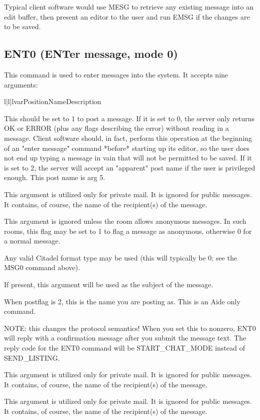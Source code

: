  Typical client software would use MESG to retrieve any existing message into
an edit buffer, then present an editor to the user and run EMSG if the changes
are to be saved.



\subsection{ENT0 (ENTer message, mode 0)}

 This command is used to enter messages into the system.  It accepts nine
arguments:


\begin{tableiii}{l|l|l}{var}{Position}{Name}{Description}

    {This should be set to 1 to post a message.  If it is set to 0, the server
    only returns OK or ERROR (plus any flags describing the error) without
    reading in a message.  Client software should, in fact, perform this
    operation at the beginning of an "enter message" command *before* starting
    up its editor, so the user does not end up typing a message in vain that
    will not be permitted to be saved.  If it is set to 2, the server will
    accept an "apparent" post name if the user is privileged enough. This post
    name is arg 5.}

    {This argument is utilized only for private mail.  It is ignored for public
    messages.  It contains, of course, the name of the recipient(s) of the
    message.}

    {This argument is ignored unless the room allows anonymous messages.  In
    such rooms, this flag may be set to 1 to flag a message as anonymous,
    otherwise 0 for a normal message.}

    {Any valid Citadel format type may be used (this will typically be 0; see
    the MSG0 command above).}

    {If present, this argument will be used as the subject of the message.}

    {When postflag is 2, this is the name you are posting as. This is an Aide
    only command.}

    {NOTE: this changes the protocol semantics!  When you set this to nonzero,
    ENT0 will reply with a confirmation message after you submit the message
    text.  The reply code for the ENT0 command will be START_CHAT_MODE instead
    of SEND_LISTING.}

    {This argument is utilized only for private mail.  It is ignored for public
    messages.  It contains, of course, the name of the recipient(s) of the
    message.}

    {This argument is utilized only for private mail.  It is ignored for public
    messages.  It contains, of course, the name of the recipient(s) of the
    message.}

\end{tableiii}


